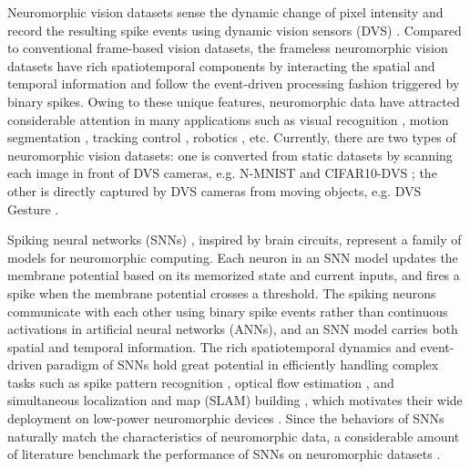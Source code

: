 \documentclass[journal,10pt,twocolumn]{IEEETran}
\begin{document}
Neuromorphic vision datasets \cite{orchard2015converting,barranco2016dataset,li2017cifar10} sense the dynamic change of pixel intensity and record the resulting spike events using dynamic vision sensors (DVS) \cite{delbruck2008frame,lichtsteiner2008128,serrano2013128,yang2015dynamic}. Compared to conventional frame-based vision datasets, the frameless neuromorphic vision datasets have rich spatiotemporal components by interacting the spatial and temporal information and follow the event-driven processing fashion triggered by binary spikes. Owing to these unique features, neuromorphic data have attracted considerable attention in many applications such as visual recognition \cite{orchard2015hfirst,zhao2014feedforward,ramesh2019dart,xiao2019event}\cite{wu2018spatio,kaiser2018synaptic,amir2017low},  motion segmentation \cite{mishra2017saccade}, tracking control \cite{drazen2011toward,conradt2009embedded,hu2016dvs}, robotics \cite{delbruck2013robotic}, etc. Currently, there are two types of neuromorphic vision datasets: one is converted from static datasets by scanning each image in front of DVS cameras, e.g. N-MNIST \cite{orchard2015converting} and CIFAR10-DVS \cite{li2017cifar10}; the other is directly captured by DVS cameras from moving objects, e.g. DVS Gesture \cite{amir2017low}.

Spiking neural networks (SNNs) \cite{maass1997networks}, inspired by brain circuits, represent a family of models for neuromorphic computing. Each neuron in an SNN model updates the membrane potential based on its memorized state and current inputs, and fires a spike when the membrane potential crosses a threshold. The spiking neurons communicate with each other using binary spike events rather than continuous activations in artificial neural networks (ANNs), and an SNN model carries both spatial and temporal information. The rich spatiotemporal dynamics and event-driven paradigm of SNNs hold great potential in efficiently handling complex tasks such as spike pattern recognition \cite{orchard2015hfirst,wu2019direct}, optical flow estimation \cite{haessig2018spiking}, and simultaneous localization and map (SLAM) building \cite{vidal2018ultimate}, which motivates their wide deployment on low-power neuromorphic devices \cite{merolla2014million,davies2018loihi,pei2019towards}. Since the behaviors of SNNs naturally match the characteristics of neuromorphic data, a considerable amount of literature benchmark the performance of SNNs on neuromorphic datasets \cite{wu2018spatio,shrestha2018slayer,jin2018hybrid,deng2020rethinking}.
\end{document}
